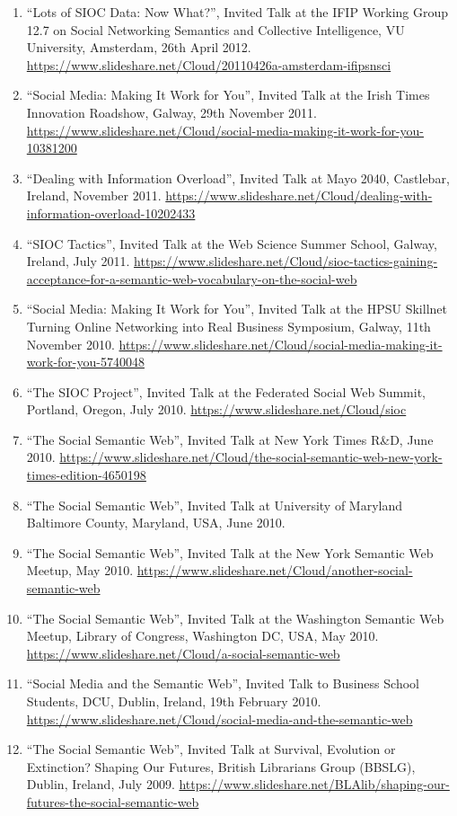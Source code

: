 \documentclass[10pt,a4paper]{res} %
\begin{document}
\begin{resume}
\begin{enumerate}
\item ``Lots of SIOC Data: Now What?'', Invited Talk at the IFIP Working Group 12.7 on Social Networking Semantics and Collective Intelligence, VU University, Amsterdam, 26th April 2012. \url{https://www.slideshare.net/Cloud/20110426a-amsterdam-ifipsnsci}
\item ``Social Media: Making It Work for You'', Invited Talk at the Irish Times Innovation Roadshow, Galway, 29th November 2011. \url{https://www.slideshare.net/Cloud/social-media-making-it-work-for-you-10381200}
\item ``Dealing with Information Overload'', Invited Talk at Mayo 2040, Castlebar, Ireland, November 2011. \url{https://www.slideshare.net/Cloud/dealing-with-information-overload-10202433}
\item ``SIOC Tactics'', Invited Talk at the Web Science Summer School, Galway, Ireland, July 2011. \url{https://www.slideshare.net/Cloud/sioc-tactics-gaining-acceptance-for-a-semantic-web-vocabulary-on-the-social-web}
\item ``Social Media: Making It Work for You'', Invited Talk at the HPSU Skillnet Turning Online Networking into Real Business Symposium, Galway, 11th November 2010. \url{https://www.slideshare.net/Cloud/social-media-making-it-work-for-you-5740048}
\item ``The SIOC Project'', Invited Talk at the Federated Social Web Summit, Portland, Oregon, July 2010. \url{https://www.slideshare.net/Cloud/sioc}
\item ``The Social Semantic Web'', Invited Talk at New York Times R\&D, June 2010. \url{https://www.slideshare.net/Cloud/the-social-semantic-web-new-york-times-edition-4650198}
\item ``The Social Semantic Web'', Invited Talk at University of Maryland Baltimore County, Maryland, USA, June 2010. %
\item ``The Social Semantic Web'', Invited Talk at the New York Semantic Web Meetup, May 2010. \url{https://www.slideshare.net/Cloud/another-social-semantic-web}
\item ``The Social Semantic Web'', Invited Talk at the Washington Semantic Web Meetup, Library of Congress, Washington DC, USA, May 2010. \url{https://www.slideshare.net/Cloud/a-social-semantic-web}
\item ``Social Media and the Semantic Web'', Invited Talk to Business School Students, DCU, Dublin, Ireland, 19th February 2010. \url{https://www.slideshare.net/Cloud/social-media-and-the-semantic-web}
\item ``The Social Semantic Web'', Invited Talk at Survival, Evolution or Extinction? Shaping Our Futures, British Librarians Group (BBSLG), Dublin, Ireland, July 2009. \url{https://www.slideshare.net/BLAlib/shaping-our-futures-the-social-semantic-web}

\end{enumerate}
\end{resume}
\end{document}
